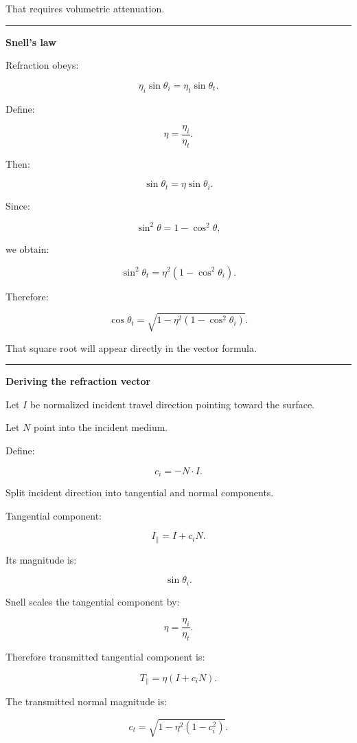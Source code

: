 That requires volumetric attenuation.

\begin{center}\rule{0.5\linewidth}{0.5pt}\end{center}

\textbf{Snell's law}

Refraction obeys:

\[
\boxed{
\eta_i\sin\theta_i
=
\eta_t\sin\theta_t.
}
\]

Define:

\[
\eta=
\frac{\eta_i}{\eta_t}.
\]

Then:

\[
\sin\theta_t=
\eta\sin\theta_i.
\]

Since:

\[
\sin^2\theta
=
1-\cos^2\theta,
\]

we obtain:

\[
\sin^2\theta_t
=
\eta^2
(1-\cos^2\theta_i).
\]

Therefore:

\[
\boxed{
\cos\theta_t
=
\sqrt{
1-
\eta^2
(1-\cos^2\theta_i)
}.
}
\]

That square root will appear directly in the vector formula.

\begin{center}\rule{0.5\linewidth}{0.5pt}\end{center}

\textbf{Deriving the refraction vector}

Let \(I\) be normalized incident travel direction pointing toward the surface.

Let \(N\) point into the incident medium.

Define:

\[
c_i=-N\cdot I.
\]

Split incident direction into tangential and normal components.

Tangential component:

\[
I_\parallel
=
I+c_iN.
\]

Its magnitude is:

\[
\sin\theta_i.
\]

Snell scales the tangential component by:

\[
\eta=\frac{\eta_i}{\eta_t}.
\]

Therefore transmitted tangential component is:

\[
T_\parallel=
\eta(I+c_iN).
\]

The transmitted normal magnitude is:

\[
c_t=
\sqrt{
1-\eta^2(1-c_i^2)
}.
\]

